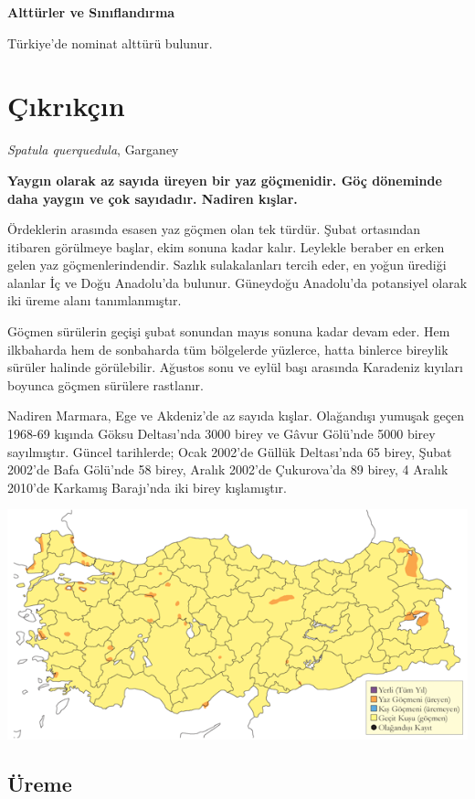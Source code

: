 \documentclass[
  letterpaper,
  DIV=11,
  numbers=noendperiod]{scrreprt}
\begin{document}
\textbf{Alttürler ve Sınıflandırma}

Türkiye'de nominat alttürü bulunur.

\hypertarget{uxe7ux131krux131kuxe7ux131n}{%
\section{Çıkrıkçın}\label{uxe7ux131krux131kuxe7ux131n}}

\emph{Spatula querquedula}, Garganey

\textbf{Yaygın olarak az sayıda üreyen bir yaz göçmenidir. Göç döneminde
daha yaygın ve çok sayıdadır. Nadiren kışlar.}

Ördeklerin arasında esasen yaz göçmen olan tek türdür. Şubat ortasından
itibaren görülmeye başlar, ekim sonuna kadar kalır. Leylekle beraber en
erken gelen yaz göçmenlerindendir. Sazlık sulakalanları tercih eder, en
yoğun ürediği alanlar İç ve Doğu Anadolu'da bulunur. Güneydoğu
Anadolu'da potansiyel olarak iki üreme alanı tanımlanmıştır.

Göçmen sürülerin geçişi şubat sonundan mayıs sonuna kadar devam eder.
Hem ilkbaharda hem de sonbaharda tüm bölgelerde yüzlerce, hatta binlerce
bireylik sürüler halinde görülebilir. Ağustos sonu ve eylül başı
arasında Karadeniz kıyıları boyunca göçmen sürülere rastlanır.

Nadiren Marmara, Ege ve Akdeniz'de az sayıda kışlar. Olağandışı yumuşak
geçen 1968-69 kışında Göksu Deltası'nda 3000 birey ve Gâvur Gölü'nde
5000 birey sayılmıştır. Güncel tarihlerde; Ocak 2002'de Güllük
Deltası'nda 65 birey, Şubat 2002'de Bafa Gölü'nde 58 birey, Aralık
2002'de Çukurova'da 89 birey, 4 Aralık 2010'de Karkamış Barajı'nda iki
birey kışlamıştır.

\includegraphics{images/harita_Page_019.png}

\hypertarget{uxfcreme-18}{%
\subsection{\texorpdfstring{\textbf{Üreme}}{Üreme}}\label{uxfcreme-18}}
\end{document}
